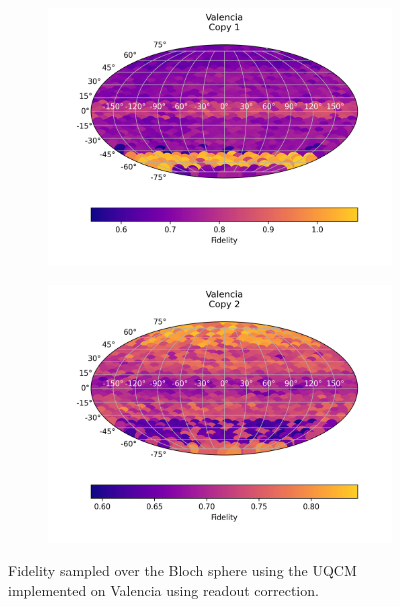 \begin{figure}[H]
    \centering
    \begin{subfigure}{.5\textwidth}
      \centering
      \includegraphics[width=\textwidth]{Figures/UQCM/IBM/FullSphere/results_corrected_valencia_copy1.png}
    \end{subfigure}%
    \begin{subfigure}{.5\textwidth}
      \centering
      \includegraphics[width=\textwidth]{Figures/UQCM/IBM/FullSphere/results_corrected_valencia_copy2.png}
    \end{subfigure}
    \caption{Fidelity sampled over the Bloch sphere using the UQCM implemented on Valencia using readout correction.}
    \label{fig:uqcm_vigo}
\end{figure}



